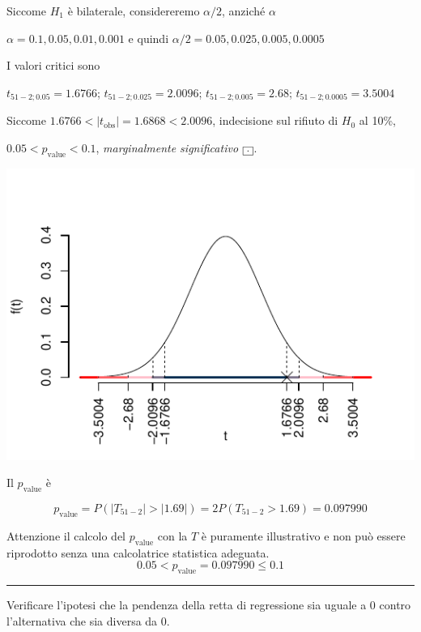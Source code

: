\documentclass[
  11pt,
]{book}
\theoremstyle{mytheoremstyle}
\theoremstyle{mydefstyle}
\newenvironment{sol}
  {
  \begin{tcolorbox}[enhanced,breakable,arc=0.1mm,boxrule=1pt,colback=white,colframe=iblue,
  title=\bf \fontfamily{lmss}\selectfont \hspace{.5 cm} Soluzione,drop fuzzy shadow]

}{
\end{tcolorbox}
  }
\begin{document}
\begin{sol}
Siccome \(H_1\) è bilaterale, considereremo \(\alpha/2\),
anziché \(\alpha\)

\(\alpha=0.1, 0.05, 0.01, 0.001\) e quindi \(\alpha/2=0.05, 0.025, 0.005, 0.0005\)

I valori critici sono

\(t_{51-2;0.05}=1.6766\); \(t_{51-2;0.025}=2.0096\); \(t_{51-2;0.005}=2.68\); \(t_{51-2;0.0005}=3.5004\)

Siccome \(1.6766<|t_\text{obs}|=1.6868<2.0096\), indecisione sul rifiuto di \(H_0\) al 10\%,

\(0.05<p_\text{value}<0.1\), \emph{marginalmente significativo} \(\fbox{.}\).

\begin{center}\includegraphics{Esami_passati_con_soluzioni_files/figure-latex/06-regr-3,-1} \end{center}

Il \(p_{\text{value}}\) è

\[ p_{\text{value}} = P(|T_{51-2}|>|1.69|)=2P(T_{51-2}>1.69)=0.097990 \]

Attenzione il calcolo del \(p_\text{value}\) con la \(T\) è puramente illustrativo e non può essere riprodotto senza una calcolatrice statistica adeguata.\[
 0.05 < p_\text{value}= 0.097990 \leq 0.1 
\]

\end{sol}

\begin{center}\rule{0.5\linewidth}{0.5pt}\end{center}

Verificare l'ipotesi che la pendenza della retta di regressione sia uguale a 0
contro l'alternativa che sia diversa da 0.
\end{document}

